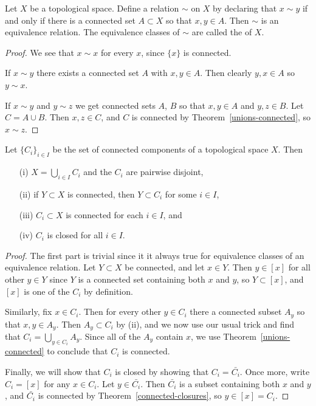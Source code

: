 \begin{prop}
  Let $X$ be a topological space. Define a relation $\sim$ on $X$ by declaring that $x \sim y$ if and only if there is a connected set $A \subset X$ so that $x,y \in A$. Then $\sim$ is an equivalence relation. The equivalence classes of $\sim$ are called the  of $X$.
\end{prop}
\begin{proof}
  We see that $x \sim x$ for every $x$, since $\{x\}$ is connected.
  
  If $x \sim y$ there exists a connected set $A$ with $x,y \in A$. Then clearly $y,x \in A$ so $y \sim x$.
  
  If $x \sim y$ and $y \sim z$ we get connected sets $A$, $B$ so that $x,y \in A$ and $y,z \in B$. Let $C = A \cup B$. Then $x,z \in C$, and $C$ is connected by Theorem~\ref{unions-connected}, so $x \sim z$.
\end{proof}
\begin{prop}
  \label{props-of-conn-components}
  Let $\{C_i\}_{i \in I}$ be the set of connected components of a topological space $X$. Then
  \begin{itemize}
    \item[(i)] $X = \bigcup_{i \in I} C_i$ and the $C_i$ are pairwise disjoint,
    \item[(ii)] if $Y \subset X$ is connected, then $Y \subset C_i$ for some $i \in I$,
    \item[(iii)] $C_i \subset X$ is connected for each $i \in I$, and
    \item[(iv)] $C_i$ is closed for all $i \in I$.
  \end{itemize}
\end{prop}
\begin{proof}
  The first part is trivial since it it always true for equivalence classes of an equivalence relation. Let $Y \subset X$ be connected, and let $x \in Y$. Then $y \in [x]$ for all other $y \in Y$ since $Y$ is a connected set containing both $x$ and $y$, so $Y \subset [x]$, and $[x]$ is one of the $C_i$ by definition.
  
  Similarly, fix $x \in C_i$. Then for every other $y \in C_i$ there a connected subset $A_y$ so that $x, y \in A_y$. Then $A_y \subset C_i$ by (ii), and we now use our usual trick and find that $C_i = \bigcup_{y \in C_i} A_y$. Since all of the $A_y$ contain $x$, we use Theorem~\ref{unions-connected} to conclude that $C_i$ is connected.
  
  Finally, we will show that $C_i$ is closed by showing that $C_i = \bar{C_i}$. Once more, write $C_i = [x]$ for any $x \in C_i$. Let $y \in \bar{C_i}$. Then $\bar{C_i}$ is a subset containing both $x$ and $y$, and $\bar{C_i}$ is connected by Theorem~\ref{connected-closures}, so $y \in [x] = C_i$.
\end{proof}
